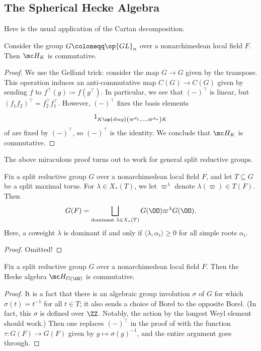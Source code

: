 \documentclass[../notes.tex]{subfiles}
\begin{document}
\subsection{The Spherical Hecke Algebra}
Here is the usual application of the Cartan decomposition.
\begin{lemma}[Gelfand] \label{lem:gelfand-trick}
	Consider the group $G\coloneqq\op{GL}_n$ over a nonarchimedean local field $F$. Then $\mc H_K$ is commutative.
\end{lemma}
\begin{proof}
	We use the Gelfand trick: consider the map $G\to G$ given by the transpose. This operation induces an anti-commutative map $C(G)\to C(G)$ given by sending $f$ to $f^\intercal(g)\coloneqq f(g^\intercal)$. In particular, we see that $(-)^\intercal$ is linear, but $(f_1f_2)^\intercal=f_2^\intercal f_1^\intercal$. However, $(-)^\intercal$ fixes the basis elements
	\[1_{K\op{diag}\left(\varpi^{d_1},\ldots,\varpi^{d_n}\right)K}\]
	of  are fixed by $(-)^\intercal$, so $(-)^\intercal$ is the identity. We conclude that $\mc H_K$ is commutative.
\end{proof}
The above miraculous proof turns out to work for general split reductive groups.
\begin{proposition}
	Fix a split reductive group $G$ over a nonarchimedean local field $F$, and let $T\subseteq G$ be a split maximal torus. For $\lambda\in X_*(T)$, we let $\varpi^\lambda$ denote $\lambda(\varpi)\in T(F)$. Then
	\[G(F)=\bigsqcup_{\text{dominant }\lambda\in X_*(T)}G(\OO)\varpi^\lambda G(\OO).\]
	Here, a coweight $\lambda$ is dominant if and only if $\langle\lambda,\alpha_i\rangle\ge0$ for all simple roots $\alpha_i$.
\end{proposition}
\begin{proof}
	Omitted!
\end{proof}
\begin{theorem}
	Fix a split reductive group $G$ over a nonarchimedean local field $F$. Then the Hecke algebra $\mc H_{G(\OO)}$ is commutative.
\end{theorem}
\begin{proof}
	It is a fact that there is an algebraic group involution $\sigma$ of $G$ for which $\sigma(t)=t^{-1}$ for all $t\in T$; it also sends a choice of Borel to the opposite Borel. (In fact, this $\sigma$ is defined over $\ZZ$. Notably, the action by the longest Weyl element should work.) Then one replaces $(-)^\intercal$ in the proof of  with the function $\tau\colon G(F)\to G(F)$ given by $g\mapsto\sigma(g)^{-1}$, and the entire argument goes through.
\end{proof}
\end{document}
